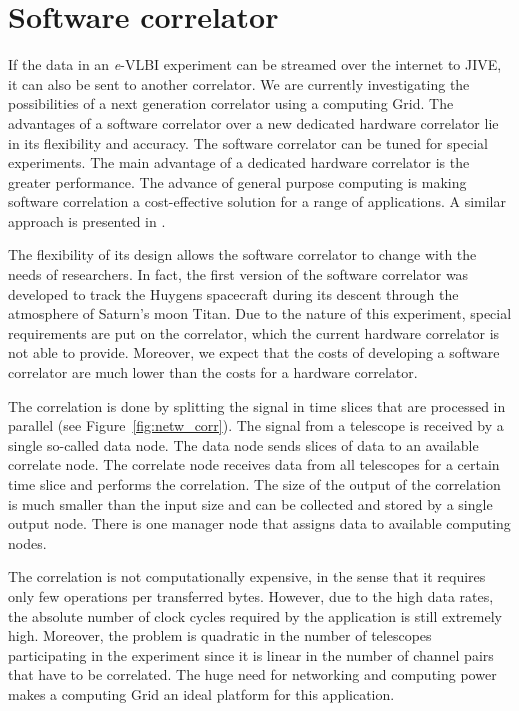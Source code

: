 \section{Software correlator}\label{sec:vlbi}
If the data in an {\it e}-VLBI experiment can be streamed over the internet
to JIVE, it can also be sent to another correlator. We are currently
investigating the possibilities of a next generation correlator using
a computing Grid. The advantages of a software correlator over a new
dedicated hardware correlator lie in its flexibility and accuracy. The
software correlator can be tuned for special experiments. The main
advantage of a dedicated hardware correlator is the greater
performance. The advance of general purpose computing is making
software correlation a cost-effective solution for a range of
applications. A similar approach is presented in \cite{deller-2007}.

The flexibility of its design allows the software correlator to change
with the needs of researchers. In fact, the first version of the
software correlator was developed to track the Huygens spacecraft
during its descent through the atmosphere of Saturn's moon Titan. Due
to the nature of this experiment, special requirements are put
on the correlator, which the current hardware correlator is not able
to provide.  Moreover, we expect that the costs of developing a
software correlator are much lower than the costs for a hardware
correlator.

The correlation is done by splitting the signal in time slices that
are processed in parallel (see Figure~\ref{fig:netw_corr}). The signal
from a telescope is received by a single so-called data node.  The
data node sends slices of data to an available correlate node. The
correlate node receives data from all telescopes for a certain time
slice and performs the correlation. The size of the output of the
correlation is much smaller than the input size and can be collected
and stored by a single output node.  There is one manager node that
assigns data to available computing nodes.

The correlation is not computationally expensive, in the sense that it
requires only few operations per transferred bytes. However, due to
the high data rates, the absolute number of clock cycles required by
the application is still extremely high. Moreover, the problem is
quadratic in the number of telescopes participating in the experiment
since it is linear in the number of channel pairs that have to be
correlated. The huge need for networking and computing power makes a
computing Grid an ideal platform for this application.


